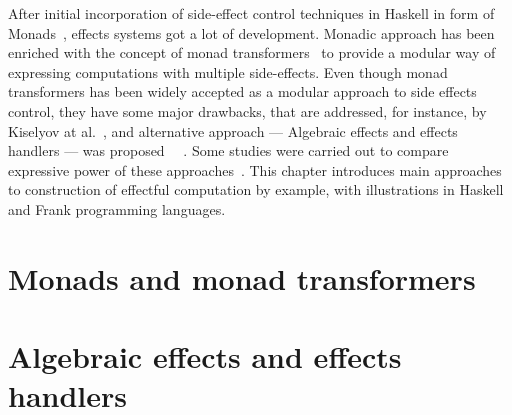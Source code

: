   After initial incorporation of side-effect control techniques in Haskell in
  form of Monads~\cite{Wadler:1992:EFP:143165.143169}, effects systems got a lot
  of development. Monadic approach has been enriched with the concept of monad
  transformers~\cite{Liang:1995:MTM:199448.199528} to provide a modular way of
  expressing computations with multiple side-effects. Even though monad
  transformers has been widely accepted as a modular approach to side effects control,
  they have some major drawbacks, that are addressed, for instance, by Kiselyov at al.~\cite{Kiselyov:2013:EEA:2578854.2503791}, and alternative approach --- Algebraic effects and effects handlers --- was proposed~\cite{DBLP:journals/jlp/BauerP15}
  ~\cite{Kiselyov:2013:EEA:2578854.2503791}. Some studies were carried out to
  compare expressive power of these approaches~\cite{DBLP:journals/corr/ForsterKLP16}.
  This chapter introduces main approaches to construction of effectful computation
  by example, with illustrations in Haskell and Frank programming languages.

  \section{Monads and monad transformers}

  \section{Algebraic effects and effects handlers}
  ~\label{cpt-effects:alg-effects}